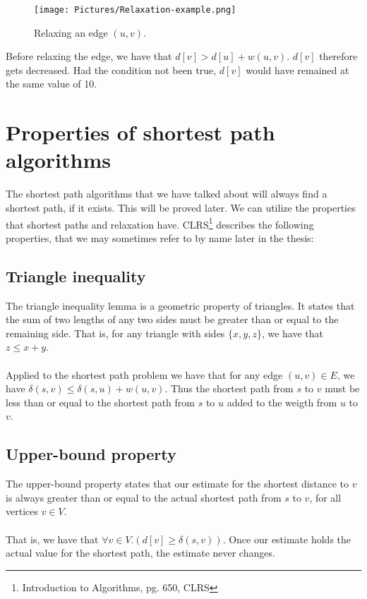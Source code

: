 \documentclass[11pt]{article}
\begin{document}
\begin{figure}[H]
\centering
\texttt{[image: Pictures/Relaxation-example.png]}
\caption{Relaxing an edge $(u,v)$.}
\end{figure}

\noindent Before relaxing the edge, we have that $d[v] > d[u] + w(u,v)$. $d[v]$ therefore gets decreased. Had the condition not been true, $d[v]$ would have remained at the same value of 10.

\section{Properties of shortest path algorithms}
The shortest path algorithms that we have talked about will always find a shortest path, if it exists. This will be proved later. We can utilize the properties that shortest paths and relaxation have. CLRS\footnote{Introduction to Algorithms, pg. 650, CLRS} describes the following properties, that we may sometimes refer to by name later in the thesis:

\subsection{Triangle inequality}
The triangle inequality lemma is a geometric property of triangles. It states that the sum of two lengths of any two sides must be greater than or equal to the remaining side. That is, for any triangle with sides $\{x,y,z\}$, we have that $z \leq x+y$.\\\\
Applied to the shortest path problem we have that for any edge $(u,v) \in E$, we have $\delta(s,v)\leq \delta(s,u) + w(u,v)$. Thus the shortest path from $s$ to $v$ must be less than or equal to the shortest path from $s$ to $u$ added to the weigth from $u$ to $v$.\\
\subsection{Upper-bound property}
The upper-bound property states that our estimate for the shortest distance to $v$ is always greater than or equal to the actual shortest path from $s$ to $v$, for all vertices $v\in V$.\\\\
That is, we have that $\forall v \in V.(d[v]\geq \delta(s,v))$. Once our estimate holds the actual value for the shortest path, the estimate never changes.\\
\end{document}
